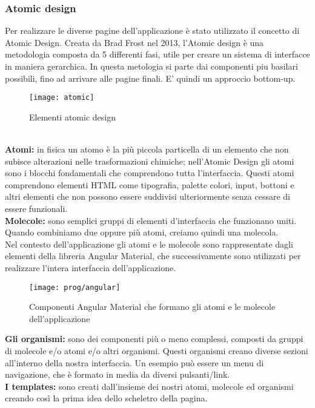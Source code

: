 \subsubsection{Atomic design}
Per realizzare le diverse pagine dell'applicazione è stato utilizzato il concetto di Atomic Design.
Creata da Brad Frost nel 2013, l'Atomic design è una metodologia composta da 5 differenti fasi, utile per creare un sistema di interfacce in maniera gerarchica. In questa metologia si parte dai componenti piu basilari possibili, fino ad arrivare alle pagine finali. E' quindi un approccio bottom-up.
\begin{figure}[!h] 
	\centering 
	\texttt{[image: atomic]} 
	\caption{Elementi atomic design}
\end{figure}
\\

\textbf{Atomi:} in fisica un atomo è la più piccola particella di un elemento che non subisce alterazioni nelle trasformazioni chimiche; nell’Atomic Design gli atomi sono i blocchi fondamentali che comprendono tutta l’interfaccia.
Questi atomi comprendono elementi HTML come tipografia, palette colori, input, bottoni e altri elementi che non possono essere suddivisi ulteriormente senza cessare di essere funzionali.
\\

\textbf{Molecole:} sono semplici gruppi di elementi d'interfaccia che funzionano uniti. Quando combiniamo due oppure più atomi, creiamo quindi una molecola.
\\

Nel contesto dell'applicazione gli atomi e le molecole sono rappresentate dagli elementi della libreria Angular Material, che successivamente sono utilizzati per realizzare l'intera interfaccia dell'applicazione.

\begin{figure}[!h] 
	\centering 
	\texttt{[image: prog/angular]} 
	\caption{Componenti Angular Material che formano gli atomi e le molecole dell'applicazione}
\end{figure} 

\textbf{Gli organismi:} sono dei componenti più o meno complessi, composti da gruppi di molecole e/o atomi e/o altri organismi. Questi organismi creano diverse sezioni all'interno della nostra interfaccia. Un esempio può essere un menu di navigazione, che è formato in media da diversi pulsanti/link. 
\\

\textbf{I templates:} sono creati dall'insieme dei nostri atomi, molecole ed organismi creando così la prima idea dello scheletro della pagina.
\\

